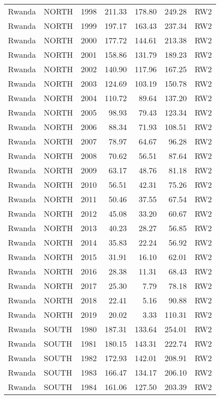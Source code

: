 \begin{longtable}{lllrrrl}
  Rwanda & NORTH & 1998 & 211.33 & 178.80 & 249.28 & RW2 \\ 
  Rwanda & NORTH & 1999 & 197.17 & 163.43 & 237.34 & RW2 \\ 
  Rwanda & NORTH & 2000 & 177.72 & 144.61 & 213.38 & RW2 \\ 
  Rwanda & NORTH & 2001 & 158.86 & 131.79 & 189.23 & RW2 \\ 
  Rwanda & NORTH & 2002 & 140.90 & 117.96 & 167.25 & RW2 \\ 
  Rwanda & NORTH & 2003 & 124.69 & 103.19 & 150.78 & RW2 \\ 
  Rwanda & NORTH & 2004 & 110.72 & 89.64 & 137.20 & RW2 \\ 
  Rwanda & NORTH & 2005 & 98.93 & 79.43 & 123.34 & RW2 \\ 
  Rwanda & NORTH & 2006 & 88.34 & 71.93 & 108.51 & RW2 \\ 
  Rwanda & NORTH & 2007 & 78.97 & 64.67 & 96.28 & RW2 \\ 
  Rwanda & NORTH & 2008 & 70.62 & 56.51 & 87.64 & RW2 \\ 
  Rwanda & NORTH & 2009 & 63.17 & 48.76 & 81.18 & RW2 \\ 
  Rwanda & NORTH & 2010 & 56.51 & 42.31 & 75.26 & RW2 \\ 
  Rwanda & NORTH & 2011 & 50.46 & 37.55 & 67.54 & RW2 \\ 
  Rwanda & NORTH & 2012 & 45.08 & 33.20 & 60.67 & RW2 \\ 
  Rwanda & NORTH & 2013 & 40.23 & 28.27 & 56.85 & RW2 \\ 
  Rwanda & NORTH & 2014 & 35.83 & 22.24 & 56.92 & RW2 \\ 
  Rwanda & NORTH & 2015 & 31.91 & 16.10 & 62.01 & RW2 \\ 
  Rwanda & NORTH & 2016 & 28.38 & 11.31 & 68.43 & RW2 \\ 
  Rwanda & NORTH & 2017 & 25.30 & 7.79 & 78.18 & RW2 \\ 
  Rwanda & NORTH & 2018 & 22.41 & 5.16 & 90.88 & RW2 \\ 
  Rwanda & NORTH & 2019 & 20.02 & 3.33 & 110.31 & RW2 \\ 
  Rwanda & SOUTH & 1980 & 187.31 & 133.64 & 254.01 & RW2 \\ 
  Rwanda & SOUTH & 1981 & 180.15 & 143.31 & 222.74 & RW2 \\ 
  Rwanda & SOUTH & 1982 & 172.93 & 142.01 & 208.91 & RW2 \\ 
  Rwanda & SOUTH & 1983 & 166.47 & 134.17 & 206.10 & RW2 \\ 
  Rwanda & SOUTH & 1984 & 161.06 & 127.50 & 203.39 & RW2 \\ 

\end{longtable}
